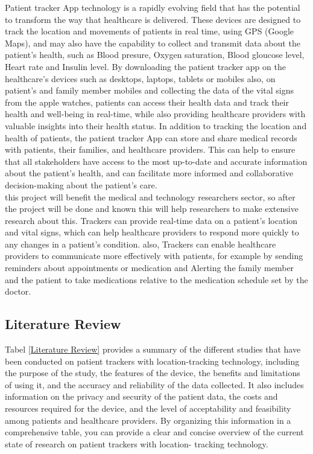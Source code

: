 \documentclass[12pt]{article}
\begin{document}
			Patient tracker App technology is a rapidly evolving field that has the potential to transform the way that healthcare is delivered. These devices are designed to track the location and movements of patients in real time, using GPS (Google Maps), and may also have the capability to collect and transmit data about the patient's health, such as Blood presure, Oxygen saturation, Blood gloucose level, Heart rate and Insulin level. By downloading the patient tracker app on the healthcare's devices such as desktops, laptops, tablets or mobiles also, on patient's and family member mobiles and collecting the data of the vital signs from the apple watches, patients can access their health data and track their health and well-being in real-time, while also providing healthcare providers with valuable insights into their health status. In addition to tracking the location and health of patients, the patient tracker App can store and share medical records with patients, their families, and healthcare providers. This can help to ensure that all stakeholders have access to the most up-to-date and accurate information about the patient's health, and can facilitate more informed and collaborative decision-making about the patient's care.\\
			
			this project will benefit the medical and technology researchers sector, so after the project will be done and known this will help researchers to make extensive research about this. Trackers can provide real-time data on a patient's location and vital signs, which can help healthcare providers to respond more quickly to any changes in a patient's condition. also, Trackers can enable healthcare providers to communicate more effectively with patients, for example by sending reminders about appointments or medication and Alerting the family member and the patient to take medications relative to the medication schedule set by the doctor.\\
			

		\subsection{Literature Review}
			Tabel \ref{Literature Review} provides a summary of the different studies that have been conducted on patient trackers with location-tracking technology, including the purpose of the study, the features of the device, the benefits and limitations of using it, and the accuracy and reliability of the data collected. It also includes information on the privacy and security of the patient data, the costs and resources required for the device, and the level of acceptability and feasibility among patients and healthcare providers. By organizing this information in a comprehensive table, you can provide a clear and concise overview of the current state of research on patient trackers with location- tracking technology.
			\\\\\\\\\\
			
\end{document}
